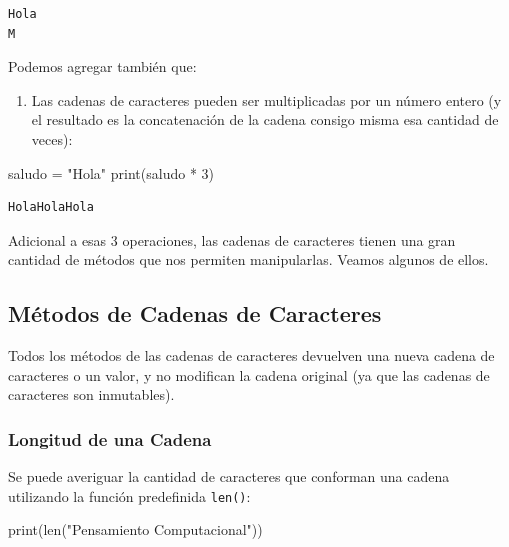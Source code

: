 \documentclass[
  letterpaper,
  DIV=11,
  numbers=noendperiod]{scrreprt}
\newenvironment{Shaded}{\begin{snugshade}}{\end{snugshade}}
\newcommand{\BuiltInTok}[1]{\textcolor[rgb]{0.00,0.23,0.31}{#1}}
\newcommand{\DecValTok}[1]{\textcolor[rgb]{0.68,0.00,0.00}{#1}}
\newcommand{\NormalTok}[1]{\textcolor[rgb]{0.00,0.23,0.31}{#1}}
\newcommand{\OperatorTok}[1]{\textcolor[rgb]{0.37,0.37,0.37}{#1}}
\newcommand{\StringTok}[1]{\textcolor[rgb]{0.13,0.47,0.30}{#1}}
\providecommand{\tightlist}{%
  \setlength{\itemsep}{0pt}\setlength{\parskip}{0pt}}\usepackage{longtable,booktabs,array}
\begin{document}
\begin{verbatim}
Hola
M
\end{verbatim}

Podemos agregar también que:

\begin{enumerate}
\def\labelenumi{\arabic{enumi}.}
\setcounter{enumi}{2}
\tightlist
\item
  Las cadenas de caracteres pueden ser multiplicadas por un número
  entero (y el resultado es la concatenación de la cadena consigo misma
  esa cantidad de veces):
\end{enumerate}

\begin{Shaded}
\begin{Highlighting}[]
\NormalTok{saludo }\OperatorTok{=} \StringTok{"Hola"}
\BuiltInTok{print}\NormalTok{(saludo }\OperatorTok{*} \DecValTok{3}\NormalTok{)}
\end{Highlighting}
\end{Shaded}

\begin{verbatim}
HolaHolaHola
\end{verbatim}

Adicional a esas 3 operaciones, las cadenas de caracteres tienen una
gran cantidad de métodos que nos permiten manipularlas. Veamos algunos
de ellos.

\subsection{Métodos de Cadenas de
Caracteres}\label{muxe9todos-de-cadenas-de-caracteres}

Todos los métodos de las cadenas de caracteres devuelven una nueva
cadena de caracteres o un valor, y no modifican la cadena original (ya
que las cadenas de caracteres son inmutables).

\subsubsection{Longitud de una Cadena}\label{longitud-de-una-cadena}

Se puede averiguar la cantidad de caracteres que conforman una cadena
utilizando la función predefinida \texttt{len()}:

\begin{Shaded}
\begin{Highlighting}[]
\BuiltInTok{print}\NormalTok{(}\BuiltInTok{len}\NormalTok{(}\StringTok{"Pensamiento Computacional"}\NormalTok{))}
\end{Highlighting}
\end{Shaded}
\end{document}
